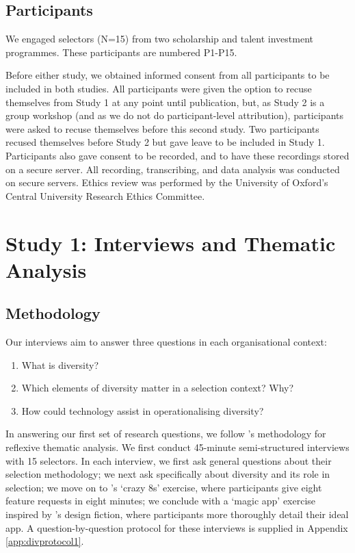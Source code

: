 \subsection{Participants}
We engaged selectors (N=15) from two scholarship and talent investment programmes. These participants are numbered P1-P15.

Before either study, we obtained informed consent from all participants to be included in both studies. All participants were given the option to recuse themselves from Study 1 at any point until publication, but, as Study 2 is a group workshop (and as we do not do participant-level attribution), participants were asked to recuse themselves before this second study. Two participants recused themselves before Study 2 but gave leave to be included in Study 1. Participants also gave consent to be recorded, and to have these recordings stored on a secure server. All recording, transcribing, and data analysis was conducted on secure servers. Ethics review was performed by the University of Oxford's Central University Research Ethics Committee.

\section[Study 1]{Study 1: Interviews and Thematic Analysis}\label{sec:study1}
\subsection{Methodology}\label{ssec:methods1}
Our interviews aim to answer three questions in each organisational context:

\begin{enumerate}
    \item What is diversity?
    \item Which elements of diversity matter in a selection context? Why?
    \item How could technology assist in operationalising diversity?
\end{enumerate}

In answering our first set of research questions, we follow \textcite{braun_using_2006}'s methodology for reflexive thematic analysis. We first conduct 45-minute semi-structured interviews with 15 selectors. In each interview, we first ask general questions about their selection methodology; we next ask specifically about diversity and its role in selection; we move on to \textcite{Knapp_Zeratzky_Kowitz_2016}'s `crazy 8s' exercise, where participants give eight feature requests in eight minutes; we conclude with a `magic app' exercise inspired by \textcite{blythe2014research}'s design fiction, where participants more thoroughly detail their ideal app. A question-by-question protocol for these interviews is supplied in Appendix \ref{app:divprotocol1}.

